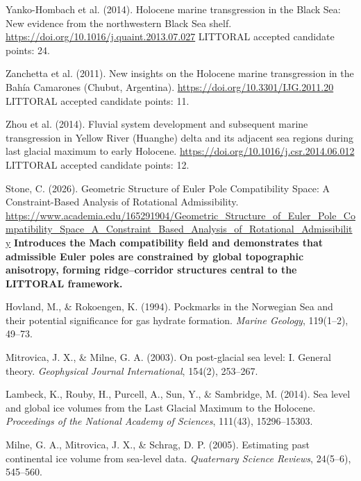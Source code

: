 \documentclass[twocolumn,10pt]{article}
\begin{document}
\begin{thebibliography}{}
Yanko-Hombach et al. (2014).
\newblock Holocene marine transgression in the Black Sea: New evidence from the northwestern Black Sea shelf.
\newblock \url{https://doi.org/10.1016/j.quaint.2013.07.027}
\newblock LITTORAL accepted candidate points: 24.

Zanchetta et al. (2011).
\newblock New insights on the Holocene marine transgression in the Bahía Camarones (Chubut, Argentina).
\newblock \url{https://doi.org/10.3301/IJG.2011.20}
\newblock LITTORAL accepted candidate points: 11.

Zhou et al. (2014).
\newblock Fluvial system development and subsequent marine transgression in Yellow River (Huanghe) delta and its adjacent sea regions during last glacial maximum to early Holocene.
\newblock \url{https://doi.org/10.1016/j.csr.2014.06.012}
\newblock LITTORAL accepted candidate points: 12.

Stone, C. (2026).
\newblock Geometric Structure of Euler Pole Compatibility Space: A Constraint-Based Analysis of Rotational Admissibility.
\newblock \url{https://www.academia.edu/165291904/Geometric_Structure_of_Euler_Pole_Compatibility_Space_A_Constraint_Based_Analysis_of_Rotational_Admissibility}
\newblock \textbf{Introduces the Mach compatibility field and demonstrates that admissible Euler poles are constrained by global topographic anisotropy, forming ridge–corridor structures central to the LITTORAL framework.}

Hovland, M., \& Rokoengen, K. (1994).
\newblock Pockmarks in the Norwegian Sea and their potential significance for gas hydrate formation.
\newblock \emph{Marine Geology}, 119(1–2), 49–73.

Mitrovica, J. X., \& Milne, G. A. (2003).
\newblock On post-glacial sea level: I. General theory.
\newblock \emph{Geophysical Journal International}, 154(2), 253–267.

Lambeck, K., Rouby, H., Purcell, A., Sun, Y., \& Sambridge, M. (2014).
\newblock Sea level and global ice volumes from the Last Glacial Maximum to the Holocene.
\newblock \emph{Proceedings of the National Academy of Sciences}, 111(43), 15296–15303.

Milne, G. A., Mitrovica, J. X., \& Schrag, D. P. (2005).
\newblock Estimating past continental ice volume from sea-level data.
\newblock \emph{Quaternary Science Reviews}, 24(5–6), 545–560.

\end{thebibliography}
\end{document}
